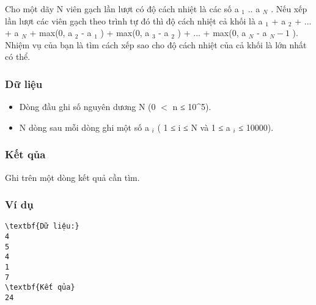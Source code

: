 



   Cho một dãy N viên gạch lần lượt có độ cách nhiệt là các số a   $_    1   $   .. a   $_    N   $   . Nếu xếp lần lượt các viên gạch theo trình tự đó thì độ cách nhiệt cả khối là a   $_    1   $   + a   $_    2   $   + ... + a   $_    N   $   + max(0, a   $_    2   $   - a   $_    1   $   ) + max(0, a   $_    3   $   - a   $_    2   $   ) + ... + max(0, a   $_    N   $   - a   $_    N - 1   $   ). Nhiệm vụ của bạn là tìm cách xếp sao cho độ cách nhiệt của cả khối là lớn nhất có thể.  

\subsubsection{   Dữ liệu  }
\begin{itemize}
	\item     Dòng đầu ghi số nguyên dương N (0 $<$ n ≤ 10\textasciicircum5).   
	\item     N dòng sau mỗi dòng ghi một số a    $_     i    $    ( 1 ≤ i ≤ N và 1 ≤ a    $_     i    $    ≤ 10000).   
\end{itemize}

\subsubsection{   Kết qủa  }

   Ghi trên một dòng kết quả cần tìm.  

\subsubsection{   Ví dụ  }
\begin{verbatim}
\textbf{Dữ liệu:} 
4
5
4
1
7
\textbf{Kết qủa} 
24 
\end{verbatim}
